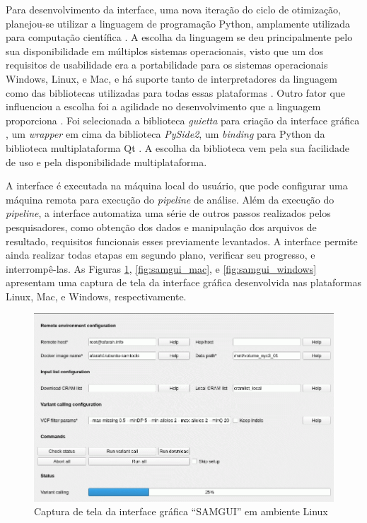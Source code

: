 \documentclass[cic,tc]{iiufrgs}
\begin{document}
Para desenvolvimento da interface, uma nova iteração do ciclo de otimização,
planejou-se utilizar a linguagem de programação Python, amplamente utilizada
para computação científica \cite{oliphant2007python}. A escolha da linguagem se
deu principalmente pelo sua disponibilidade em múltiplos sistemas operacionais,
visto que um dos requisitos de usabilidade era a portabilidade para os sistemas
operacionais Windows, Linux, e Mac, e há suporte tanto de interpretadores da
linguagem como das bibliotecas utilizadas para todas essas plataformas
\cite{oliphant2007python}. Outro fator que influenciou a escolha foi a
agilidade no desenvolvimento que a linguagem proporciona
\cite{oliphant2007python}. Foi selecionada a biblioteca \textit{guietta} para
criação da interface gráfica \cite{guietta}, um \textit{wrapper} em cima da
biblioteca \textit{PySide2}, um \textit{binding} para Python da biblioteca
multiplataforma Qt \cite{loganathan2013pyside}. A escolha da biblioteca vem
pela sua facilidade de uso e pela disponibilidade multiplataforma. 

A interface é executada na máquina local do usuário, que pode configurar uma
máquina remota para execução do \textit{pipeline} de análise. Além da execução
do \textit{pipeline}, a interface automatiza uma série de outros passos
realizados pelos pesquisadores, como obtenção dos dados e manipulação dos
arquivos de resultado, requisitos funcionais esses previamente levantados. A
interface permite ainda realizar todas etapas em segundo plano, verificar seu
progresso, e interrompê-las. As Figuras \ref{fig:samgui_linux},
\ref{fig:samgui_mac}, e \ref{fig:samgui_windows} apresentam uma captura de tela
da interface gráfica desenvolvida nas plataformas Linux, Mac, e Windows,
respectivamente.

\begin{figure}
  \caption{Captura de tela da interface gráfica ``SAMGUI'' em ambiente Linux}
    \begin{center}
      \includegraphics[width=0.85\linewidth]{img/samgui_linux.png}
    \end{center}
    \label{fig:samgui_linux}
\end{figure}
\end{document}
